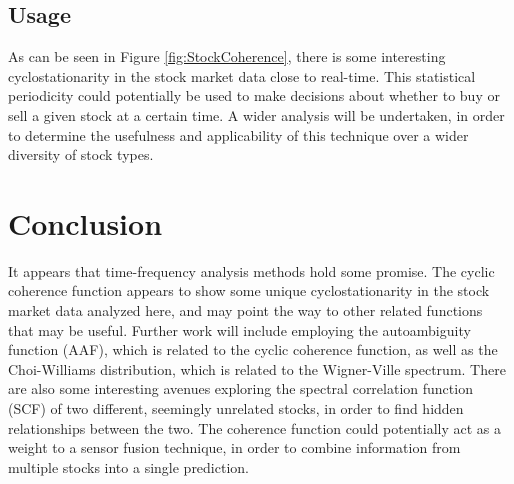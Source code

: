 \documentclass[journal]{IEEEtran}
\begin{document}
\subsection{Usage}
As can be seen in Figure \ref{fig:StockCoherence}, there is some interesting cyclostationarity in the stock market data close to real-time. This
statistical periodicity could potentially be used to make decisions about whether to buy or sell a given stock at a certain time. A wider analysis will
be undertaken, in order to determine the usefulness and applicability of this technique over a wider diversity of stock types.

\section{Conclusion}
It appears that time-frequency analysis methods hold some promise. The cyclic coherence function appears to show some unique cyclostationarity in
the stock market data analyzed here, and may point the way to other related functions that may be useful. Further work will include employing the 
autoambiguity function (AAF), which is related to the cyclic coherence function, as well as the Choi-Williams distribution, which is related to the 
Wigner-Ville spectrum. There are also some interesting avenues exploring the spectral correlation function (SCF) of two different, seemingly unrelated 
stocks, in order to find hidden relationships between the two. The coherence function could potentially act as a weight to a sensor fusion technique, in 
order to combine information from multiple stocks into a single prediction. 
\end{document}
